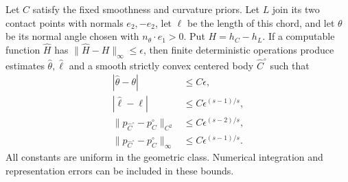 \begin{lemma}
\label{lem:two-field-stable-chord}
Let $C$ satisfy the fixed smoothness and curvature priors.  Let $L$
join its two contact points with normals $e_2,-e_2$, let
$\ell$ be the length of this chord, and let $\theta$ be its normal
angle chosen with $n_\theta\cdot e_1>0$.  Put
$H=h_C-h_L$.  If a computable function $\widehat H$ has
$\|\widehat H-H\|_\infty\le\epsilon$, then finite deterministic
operations produce estimates $\widehat\theta,\widehat\ell$ and a
smooth strictly convex centered body $\widehat C^\circ$ such that
\begin{align}
 |\widehat\theta-\theta|&\le C\epsilon,
             \label{eq:two-field-chord-angle-error}\\
 |\widehat\ell-\ell|&\le C\epsilon^{(s-1)/s},
             \label{eq:two-field-chord-length-error}\\
 \|p_{\widehat C^\circ}-p_C^\circ\|_{C^2}
             &\le C\epsilon^{(s-2)/s},
             \label{eq:two-field-chord-C2-error}\\
 \|p_{\widehat C^\circ}-p_C^\circ\|_\infty
             &\le C\epsilon^{(s-1)/s}.
             \label{eq:two-field-chord-C0-error}
\end{align}
All constants are uniform in the geometric class.  Numerical
integration and representation errors can be included in these bounds.
\end{lemma}

